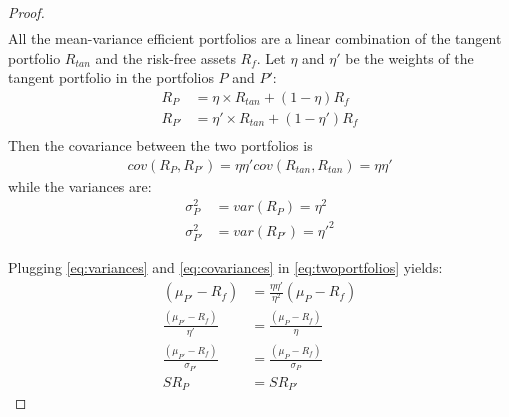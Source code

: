 \documentclass[10pt]{article}
\newenvironment{exercise}[2][Exercise]{\begin{trivlist}
  \item[\hskip \labelsep {\bfseries #1}\hskip \labelsep {\bfseries #2.}]}{\end{trivlist}}
\begin{document}
\begin{exercise}{1}
\begin{itemize}
\begin{proof}
\begin{align}
               \end{align}
               All the mean-variance efficient portfolios are a linear
               combination of the tangent portfolio $R_{tan}$ and the risk-free
               assets $R_f$. Let $\eta$ and $\eta'$ be the weights of the tangent
               portfolio in the portfolios $P$ and $P'$:
               \begin{align*}
                 R_{P} &= \eta \times R_{tan} + (1 - \eta) R_f \\
                 R_{P'} &= \eta' \times R_{tan} + (1 - \eta') R_f \\
               \end{align*}
               Then the covariance between the two portfolios is
               \begin{align}
                 \label{eq:covariances}
                 cov(R_P, R_{P'}) = \eta \eta' cov(R_{tan}, R_{tan}) = \eta \eta'
               \end{align}
               while the variances are:
               \begin{align}
                 \label{eq:variances}
                 \sigma^2_P &= var(R_{P}) = \eta^2 \\
                 \sigma^2_{P'} &= var(R_{P'}) = \eta'^2
               \end{align}

               Plugging \autoref{eq:variances} and \autoref{eq:covariances} in
               \autoref{eq:twoportfolios} yields:
               \begin{align*}
                 (\mu_{P'} - R_f) &= \frac{\eta \eta'}{\eta^2} (\mu_P - R_f) \\
                 \frac{(\mu_{P'} - R_f)}{\eta'} &= \frac{(\mu_P - R_f)}{\eta} \\
                 \frac{(\mu_{P'} - R_f)}{\sigma_{P'}} &= \frac{(\mu_P - R_f)}{\sigma_{P}} \\
                 SR_{P} &= SR_{P'}
               \end{align*}
               \end{proof}
           

    \end{itemize}
  \end{exercise}
\end{document}
